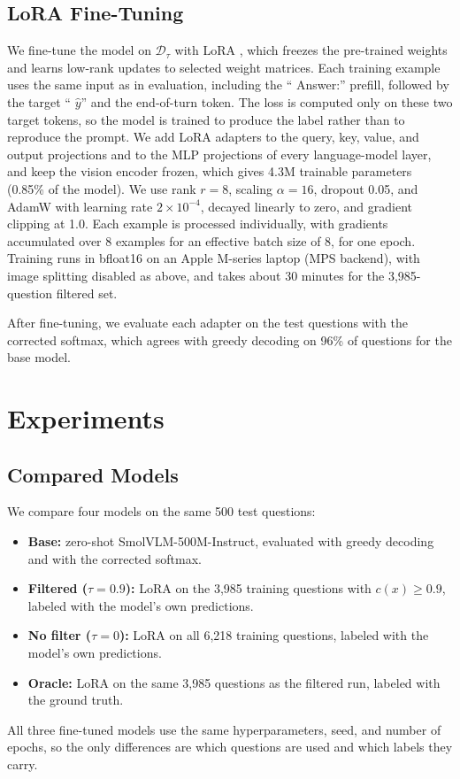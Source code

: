 \documentclass{article}
\begin{document}
\subsection{LoRA Fine-Tuning}
We fine-tune the model on $\mathcal{D}_\tau$ with LoRA \citep{hu2022lora}, which freezes the pre-trained weights and learns low-rank updates to selected weight matrices. Each training example uses the same input as in evaluation, including the `` Answer:'' prefill, followed by the target `` $\hat{y}$'' and the end-of-turn token. The loss is computed only on these two target tokens, so the model is trained to produce the label rather than to reproduce the prompt. We add LoRA adapters to the query, key, value, and output projections and to the MLP projections of every language-model layer, and keep the vision encoder frozen, which gives 4.3M trainable parameters (0.85\% of the model). We use rank $r = 8$, scaling $\alpha = 16$, dropout 0.05, and AdamW with learning rate $2 \times 10^{-4}$, decayed linearly to zero, and gradient clipping at 1.0. Each example is processed individually, with gradients accumulated over 8 examples for an effective batch size of 8, for one epoch. Training runs in bfloat16 on an Apple M-series laptop (MPS backend), with image splitting disabled as above, and takes about 30 minutes for the 3,985-question filtered set.

After fine-tuning, we evaluate each adapter on the test questions with the corrected softmax, which agrees with greedy decoding on 96\% of questions for the base model.

\section{Experiments}

\subsection{Compared Models}
We compare four models on the same 500 test questions:
\begin{itemize}[itemsep=1pt,topsep=2pt]
  \item \textbf{Base:} zero-shot SmolVLM-500M-Instruct, evaluated with greedy decoding and with the corrected softmax.
  \item \textbf{Filtered ($\tau = 0.9$):} LoRA on the 3,985 training questions with $c(x) \geq 0.9$, labeled with the model's own predictions.
  \item \textbf{No filter ($\tau = 0$):} LoRA on all 6,218 training questions, labeled with the model's own predictions.
  \item \textbf{Oracle:} LoRA on the same 3,985 questions as the filtered run, labeled with the ground truth.
\end{itemize}
All three fine-tuned models use the same hyperparameters, seed, and number of epochs, so the only differences are which questions are used and which labels they carry.
\end{document}
